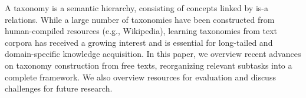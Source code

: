 A taxonomy is a semantic hierarchy, consisting of concepts linked by is-a relations. While a large number of taxonomies have been constructed from human-compiled resources (e.g., Wikipedia), learning taxonomies from text corpora has received a growing interest and is essential for long-tailed and domain-specific knowledge acquisition. In this paper, we overview recent advances on taxonomy construction from free texts, reorganizing relevant subtasks into a complete framework. We also overview resources for evaluation and discuss challenges for future research.
